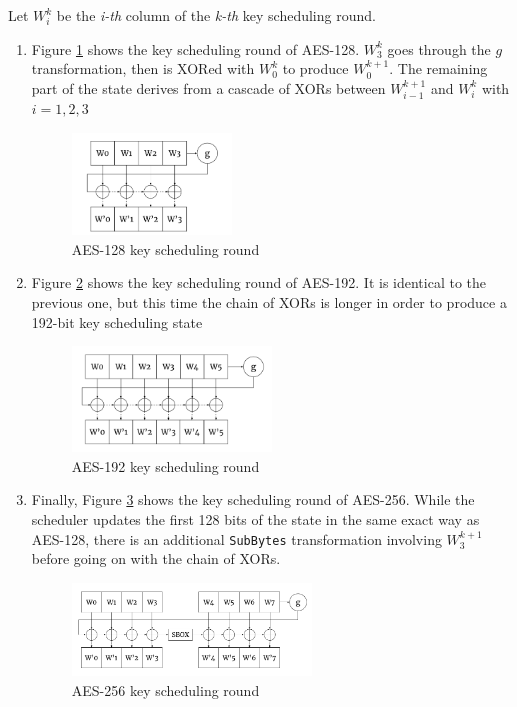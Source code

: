 Let $W^k_i$ be the \textit{i-th} column of the \textit{k-th} key scheduling round.
\begin{enumerate}
  \item Figure \ref{fig:aes128} shows the key scheduling round of AES-128.
$W^k_3$ goes through the $g$ transformation, then is XORed with $W^k_0$ to produce $W^{k+1}_0$.
The remaining part of the state derives from a cascade of XORs between $W^{k+1}_{i-1}$ and
$W^k_i$ with $i=1,2,3$
    \begin{figure}[h]
      \centering
      \includegraphics[width=0.4\textwidth]{figures/aes_128}
      \caption{AES-128 key scheduling round}
      \label{fig:aes128}
    \end{figure}
  \item Figure \ref{fig:aes192} shows the key scheduling round of AES-192.
It is identical to the previous one, but this time the chain of XORs is longer in order to
produce a 192-bit key scheduling state
    \begin{figure}[h]
      \centering
      \includegraphics[width=0.5\textwidth]{figures/aes_192}
      \caption{AES-192 key scheduling round}
      \label{fig:aes192}
    \end{figure}
  \item Finally, Figure \ref{fig:aes256} shows the key scheduling round of AES-256.
While the scheduler  updates the first 128 bits of the state in the same exact way as AES-128,
there is an additional \texttt{SubBytes} transformation involving $W^{k+1}_3$ before going on with
the chain of XORs.
    \begin{figure}[h]
      \centering
      \includegraphics[width=0.6\textwidth]{figures/aes_256}
      \caption{AES-256 key scheduling round}
      \label{fig:aes256}
\end{figure}
\end{enumerate}

